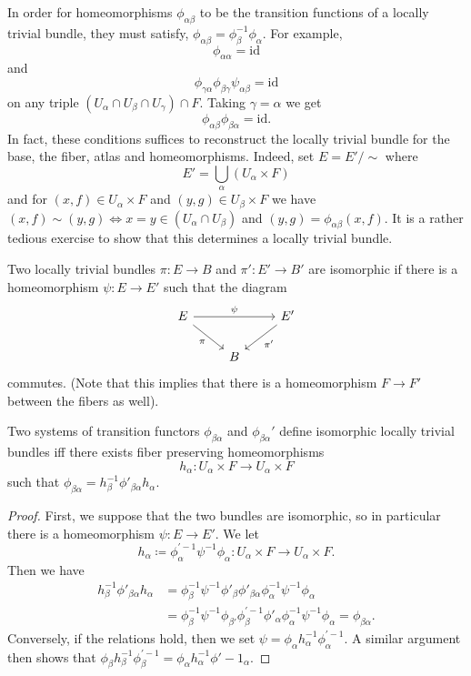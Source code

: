 \documentclass[ma3408.tex]{subfiles}
\begin{document}
\begin{Rem}
In order for homeomorphisms $\phi_{\alpha\beta}$ to be the transition functions of a locally trivial bundle, they must satisfy, $\phi_{\alpha\beta} = \phi_{\beta}^{-1}\phi_{\alpha}$. For example,
\[
\phi_{\alpha\alpha} = \text{id} 
\]
and
\[
 \phi_{\gamma\alpha}\phi_{\beta\gamma}\psi_{\alpha\beta} = \text{id}
\]
on any triple $(U_{\alpha} \cap U_{\beta} \cap U_{\gamma}) \cap F$. Taking $\gamma = \alpha$ we get
\[
\phi_{\alpha\beta}\phi_{\beta\alpha} = \text{id}.
\]
In fact, these conditions suffices to reconstruct the locally trivial bundle for the base, the fiber, atlas and homeomorphisms. Indeed, set $E = E'/\sim$ where
\[
E' = \bigcup_{\alpha} (U_{\alpha} \times F)
\]
and for $(x,f) \in U_{\alpha} \times F$ and $(y,g) \in U_{\beta} \times F$ we have $(x,f) \sim (y,g) \iff x = y \in (U_{\alpha} \cap U_{\beta})$ and $(y,g) = \phi_{\alpha\beta}(x,f)$. It is a rather tedious exercise to show that this determines a locally trivial bundle. 
\end{Rem}
\begin{Def}
Two locally trivial bundles $\pi \colon E \to B$ and $\pi' \colon E' \to B'$ are isomorphic if there is a homeomorphism $\psi \colon E \to E'$ such that the diagram
\[\begin{tikzcd}[ampersand replacement=\&]
	E \&\& {E'} \\
	\& B
	\arrow["\psi", from=1-1, to=1-3]
	\arrow["\pi"', from=1-1, to=2-2]
	\arrow["{\pi'}", from=1-3, to=2-2]
\end{tikzcd}\]
commutes. (Note that this implies that there is a homeomorphism $F \to F'$ between the fibers as well).
\end{Def}
\begin{Thm}
Two systems of transition functors $\phi_{\beta\alpha}$ and $\phi_{\beta\alpha}'$ define isomorphic locally trivial bundles iff there exists fiber preserving homeomorphisms
\[
h_{\alpha} \colon U_{\alpha} \times F \to U_{\alpha} \times F
\]
such that $\phi_{\beta\alpha}= h_{\beta}^{-1}\phi'_{\beta\alpha}h_{\alpha}$. 
\end{Thm}
\begin{proof}
First, we suppose that the two bundles are isomorphic, so in particular there is a homeomorphism $\psi \colon E \to E'$. We let 
\[h_{\alpha} \coloneqq \phi_{\alpha}^{'-1}\psi^{-1}\phi_{\alpha}\colon U_{\alpha} \times F \to U_{\alpha} \times F. 
\]
Then we have
\[
\begin{split}
h_{\beta}^{-1}\phi'_{\beta\alpha}h_{\alpha} &= \phi_{\beta}^{-1}\psi^{-1}\phi'_{\beta}\phi'_{\beta\alpha}\phi_{\alpha}^{-1}\psi^{-1}\phi_{\alpha}\\
&=\phi_{\beta}^{-1}\psi^{-1}\phi_{\beta'}\phi_{\beta}^{'-1}\phi'_{\alpha}\phi_{\alpha}^{-1}\psi^{-1}\phi_{\alpha} = \phi_{\beta\alpha}.
\end{split}
\]
Conversely, if the relations hold, then we set $\psi = \phi_{\alpha}h_{\alpha}^{-1}\phi^{'-1}_{\alpha}$. A similar argument then shows that $\phi_{\beta}h_{\beta}^{-1}\phi^{'-1}_{\beta} = \phi_{\alpha}h_{\alpha}^{-1}\phi{'-1}_{\alpha}$. 
\end{proof}
\end{document}
